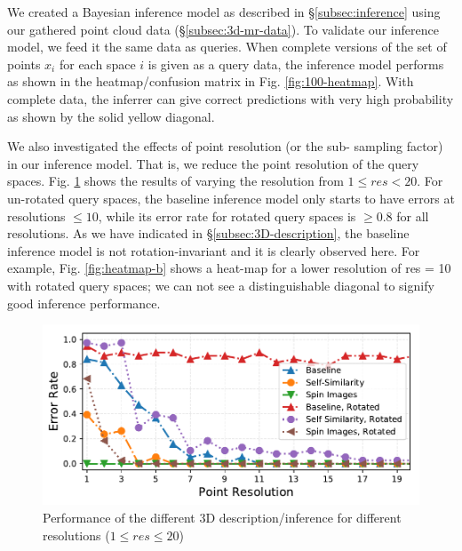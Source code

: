 We created a Bayesian inference model as described in \S\ref{subsec:inference} using our gathered point cloud data (\S\ref{subsec:3d-mr-data}). To validate our inference model, we feed it the same data as queries. When complete versions of the set of points ${x_i}$ for each space $i$ is given as a query data, the inference model performs as shown in the heatmap/confusion matrix in Fig. \ref{fig:100-heatmap}. With complete data, the inferrer can give correct predictions with very high probability as shown by the solid yellow diagonal.


We also investigated the effects of point resolution (or the sub- sampling factor) in our inference model. That is, we reduce the point resolution of the query spaces. Fig. \ref{fig:performance} shows the results of varying the resolution from $1 \leq res < 20$. For un-rotated query spaces, the baseline inference model only starts to have errors at resolutions $\leq 10$, while its error rate for rotated query spaces is $\geq 0.8$ for all resolutions. As we have indicated in \S\ref{subsec:3D-description}, the baseline inference model is not rotation-invariant and it is clearly observed here. For example, Fig. \ref{fig:heatmap-b} shows a heat-map for a lower resolution of res = 10 with rotated query spaces; we can not see a distinguishable diagonal to signify good inference performance.

\begin{figure}[t!]
	\vspace {-2mm}
	\centering
	\includegraphics[width=\columnwidth]{figures/plots/2-validation}
	\vspace{-5mm}
	\caption{\small Performance of the different 3D description/inference for different resolutions ($1 \leq res \leq 20$)}
	\vspace{-2mm}
	\label{fig:performance}
\end{figure}

